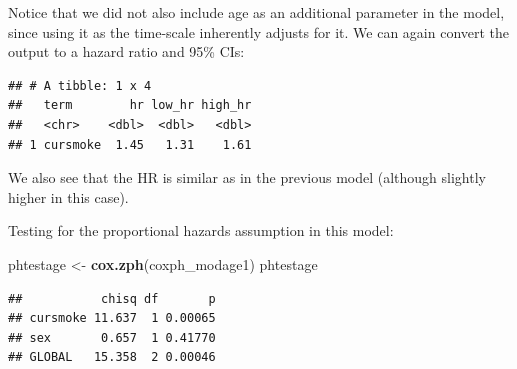 \documentclass[
]{book}
\newenvironment{Shaded}{\begin{snugshade}}{\end{snugshade}}
\newcommand{\DataTypeTok}[1]{\textcolor[rgb]{0.13,0.29,0.53}{#1}}
\newcommand{\FloatTok}[1]{\textcolor[rgb]{0.00,0.00,0.81}{#1}}
\newcommand{\KeywordTok}[1]{\textcolor[rgb]{0.13,0.29,0.53}{\textbf{#1}}}
\newcommand{\NormalTok}[1]{#1}
\newcommand{\OperatorTok}[1]{\textcolor[rgb]{0.81,0.36,0.00}{\textbf{#1}}}
\newcommand{\StringTok}[1]{\textcolor[rgb]{0.31,0.60,0.02}{#1}}
\begin{document}
Notice that we did not also include age as an additional parameter in the model, since using it as the time-scale inherently adjusts for it. We can again convert the output to a hazard ratio and 95\% CIs:

\begin{Shaded}
\end{Shaded}

\begin{verbatim}
## # A tibble: 1 x 4
##   term        hr low_hr high_hr
##   <chr>    <dbl>  <dbl>   <dbl>
## 1 cursmoke  1.45   1.31    1.61
\end{verbatim}

We also see that the HR is similar as in the previous model (although slightly higher in this case).

Testing for the proportional hazards assumption in this model:

\begin{Shaded}
\begin{Highlighting}[]
\NormalTok{phtestage <-}\StringTok{ }\KeywordTok{cox.zph}\NormalTok{(coxph_modage1)}
\NormalTok{phtestage}
\end{Highlighting}
\end{Shaded}

\begin{verbatim}
##           chisq df       p
## cursmoke 11.637  1 0.00065
## sex       0.657  1 0.41770
## GLOBAL   15.358  2 0.00046
\end{verbatim}
\end{document}

